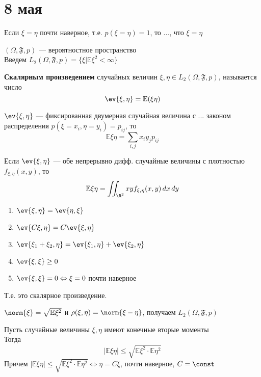 \chapter{8 мая}

\begin{remark}
    Если \(\xi = \eta\) почти наверное, т.е. \(p(\xi = \eta) = 1\), то ..., что \(\xi = \eta\)
\end{remark}
\((\Omega, \mathfrak{F}, p)\) --- вероятностное пространство \\
Введем \(L_2(\Omega, \mathfrak{F}, p) = \{\xi \big| \mathbb{E}\xi^2 < \infty\}\)
\begin{definition}
    \textbf{Скалярным произведением} случайных величин \(\xi,\eta \in L_2(\Omega, \mathfrak{F}, p)\), называется число
    \[ \ev{\xi,\eta} = \mathbb{E}(\xi\eta) \]
\end{definition}
\begin{remark}
    \(\ev{\xi, \eta}\) --- фиксированная двумерная случайная величина с ... законом распределения \(p(\xi = x_i, \eta = y_i) = p_{ij}\), то
    \[ \mathbb{E}\xi\eta = \sum_{i, j} x_i y_j p_{ij} \]
\end{remark}
\begin{remark}
    Если \(\ev{\xi, \eta}\) --- обе непрерывно дифф. случайные величины с плотностью \(f_{\xi,\eta}(x, y)\), то
    \[ \mathbb{E}\xi\eta = \iint_{\R^2} xyf_{\xi,\eta}(x, y)\,dx\,dy \]
\end{remark}
\begin{prop}\itemfix
    \begin{enumerate}
        \item \(\ev{\xi, \eta} = \ev{\eta, \xi}\)
        \item \(\ev{C\xi, \eta} = C\ev{\xi, \eta}\)
        \item \(\ev{\xi_1 + \xi_2, \eta} = \ev{\xi_1,\eta} + \ev{\xi_2, \eta}\)
        \item \(\ev{\xi, \xi} \ge 0\)
        \item \(\ev{\xi,\xi} = 0 \Leftrightarrow \xi = 0\) почти наверное
    \end{enumerate}
    Т.е. это скалярное произведение.
\end{prop}
\begin{definition}
    \(\norm{\xi} = \sqrt{\mathbb{E}\xi^2}\) и \(\rho(\xi, \eta) = \norm{\xi - \eta}\), получаем \(L_2(\Omega, \mathfrak{F}, p)\)
\end{definition}
\begin{theorem}
    Пусть случайные величины \(\xi, \eta\) имеют конечные вторые моменты \\
    Тогда
    \[ |\mathbb{E}\xi\eta| \le \sqrt{\mathbb{E}\xi^2 \cdot \mathbb{\mathbb{E}}\eta^2} \]
    Причем \( |\mathbb{E}\xi\eta| \le \sqrt{\mathbb{E}\xi^2 \cdot \mathbb{E}\eta^2} \Leftrightarrow \eta = C\xi\), почти наверное, \(C = \const\)
\end{theorem}
